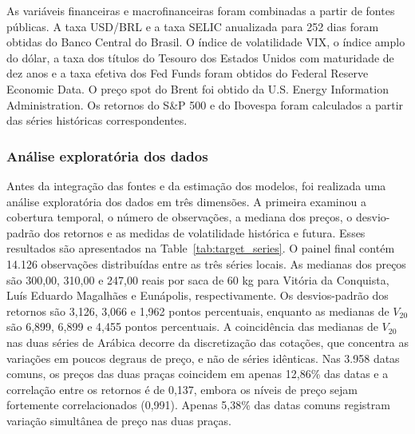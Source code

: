 \documentclass[a4paper,fleqn]{cas-sc}
\begin{document}
As variáveis financeiras e macrofinanceiras foram combinadas a partir de fontes públicas. A taxa USD/BRL e a taxa SELIC anualizada para 252 dias foram obtidas do Banco Central do Brasil. O índice de volatilidade VIX, o índice amplo do dólar, a taxa dos títulos do Tesouro dos Estados Unidos com maturidade de dez anos e a taxa efetiva dos Fed Funds foram obtidos do Federal Reserve Economic Data. O preço spot do Brent foi obtido da U.S. Energy Information Administration. Os retornos do S\&P 500 e do Ibovespa foram calculados a partir das séries históricas correspondentes.

\subsubsection{Análise exploratória dos dados}
\label{subsec:eda}

Antes da integração das fontes e da estimação dos modelos, foi realizada uma análise exploratória dos dados em três dimensões. A primeira examinou a cobertura temporal, o número de observações, a mediana dos preços, o desvio-padrão dos retornos e as medidas de volatilidade histórica e futura. Esses resultados são apresentados na Table~\ref{tab:target_series}. O painel final contém 14.126 observações distribuídas entre as três séries locais. As medianas dos preços são 300,00, 310,00 e 247,00 reais por saca de 60 kg para Vitória da Conquista, Luís Eduardo Magalhães e Eunápolis, respectivamente. Os desvios-padrão dos retornos são 3,126, 3,066 e 1,962 pontos percentuais, enquanto as medianas de \(V_{20}\) são 6,899, 6,899 e 4,455 pontos percentuais. A coincidência das medianas de \(V_{20}\) nas duas séries de Arábica decorre da discretização das cotações, que concentra as variações em poucos degraus de preço, e não de séries idênticas. Nas 3.958 datas comuns, os preços das duas praças coincidem em apenas 12,86\% das datas e a correlação entre os retornos é de 0,137, embora os níveis de preço sejam fortemente correlacionados (0,991). Apenas 5,38\% das datas comuns registram variação simultânea de preço nas duas praças.
\end{document}
